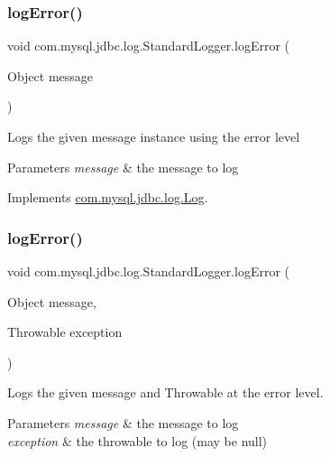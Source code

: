 \subsubsection{\texorpdfstring{log\+Error()}{logError()}\hspace{0.1cm}{\footnotesize\ttfamily [1/2]}}
{\footnotesize\ttfamily void com.\+mysql.\+jdbc.\+log.\+Standard\+Logger.\+log\+Error (\begin{DoxyParamCaption}\item[{Object}]{message }\end{DoxyParamCaption})}

Logs the given message instance using the \textquotesingle{}error\textquotesingle{} level


\begin{DoxyParams}{Parameters}
{\em message} & the message to log \\
\hline
\end{DoxyParams}


Implements \mbox{\hyperlink{interfacecom_1_1mysql_1_1jdbc_1_1log_1_1_log_aefe78baa37affef138eaba105b699022}{com.\+mysql.\+jdbc.\+log.\+Log}}.

\mbox{\label{classcom_1_1mysql_1_1jdbc_1_1log_1_1_standard_logger_a92546621212faa486bfeb5572e55a48a}} 
\subsubsection{\texorpdfstring{log\+Error()}{logError()}\hspace{0.1cm}{\footnotesize\ttfamily [2/2]}}
{\footnotesize\ttfamily void com.\+mysql.\+jdbc.\+log.\+Standard\+Logger.\+log\+Error (\begin{DoxyParamCaption}\item[{Object}]{message,  }\item[{Throwable}]{exception }\end{DoxyParamCaption})}

Logs the given message and Throwable at the \textquotesingle{}error\textquotesingle{} level.


\begin{DoxyParams}{Parameters}
{\em message} & the message to log \\
\hline
{\em exception} & the throwable to log (may be null) \\
\hline
\end{DoxyParams}


